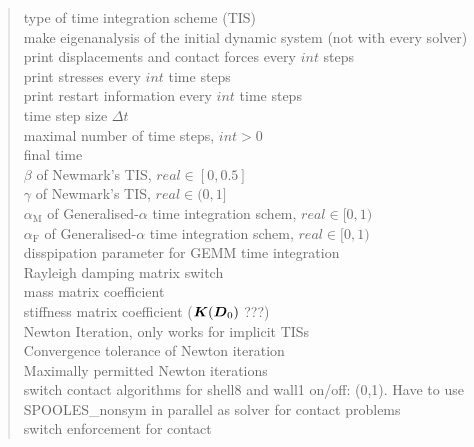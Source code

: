 \begin{quote}
 \chs type
of time integration scheme (TIS) \\
 \chs make eigenanalysis of the initial dynamic
system (not with every solver) \\
 \chs print displacements and contact forces every $int$
steps \\
 \chs print stresses every $int$ time steps \\
 \chs print restart information every $int$ time steps
\\
 \chs time step size $\Delta t$ \\
 \chs maximal number of time steps, $int>0$ \\
 \chs final time \\
 \chs $\beta$ of Newmark's TIS,
$real\in[0,0.5]$ \\
 \chs $\gamma$ of Newmark's TIS,
$real\in(0,1]$ \\
 \chs $\alpha_\text{M}$ of Generalised-$\alpha$ time
integration schem, $real\in[0,1)$ \\
 \chs $\alpha_\text{F}$ of Generalised-$\alpha$ time
integration schem, $real\in[0,1)$ \\
 \chs disspipation parameter for GEMM time integration \\
  Rayleigh damping matrix switch \\
 \chs mass matrix coefficient \\
 \chs stiffness matrix coefficient ($\boldsymbol{K}(\boldsymbol{D}_0)$
???)\\
 \chs Newton Iteration, only
 works for implicit TISs \\
 \chs Convergence tolerance of Newton iteration \\
 \chs Maximally permitted Newton iterations \\
 \chs switch contact algorithms for
shell8 and wall1 on/off: (0,1). Have to use SPOOLES\_nonsym in parallel as
solver for contact problems \\
 \chs switch enforcement for contact

\end{quote}
